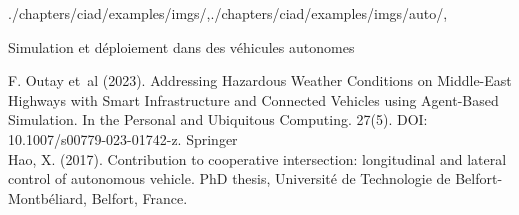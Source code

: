 \begin{graphicspathcontext}{{./chapters/ciad/examples/imgs/},{./chapters/ciad/examples/imgs/auto/},\old}

\begin{frame}[fragile]{{Simulation et déploiement} dans des véhicules autonomes}
	\vspace{1cm}
	\begin{center}
		\tiny F. Outay et~al (2023). Addressing Hazardous Weather Conditions on Middle-East Highways with Smart Infrastructure and Connected Vehicles using Agent-Based Simulation. In the Personal and Ubiquitous Computing. 27(5). DOI: 10.1007/s00779-023-01742-z. Springer \\
		\tiny Hao, X. (2017). Contribution to cooperative intersection: longitudinal and lateral control of autonomous vehicle. PhD thesis, Université de Technologie de Belfort-Montbéliard, Belfort, France.
	\end{center}
\end{frame}

\end{graphicspathcontext}

\endinput
